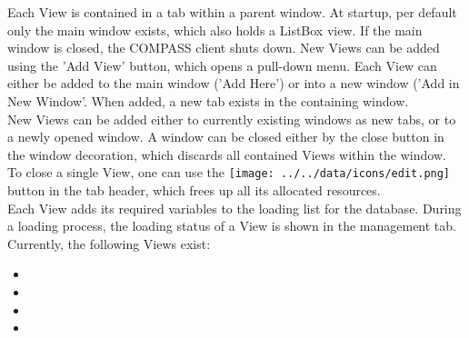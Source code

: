 Each View is contained in a tab within a parent window.  At startup, per default only the main window exists, which also holds
a ListBox view. If the main window is closed, the COMPASS client shuts down. New Views can be added using the 'Add View' button, which opens a pull-down menu. Each View can either be added to the main window ('Add Here') or into a new window ('Add in New Window'. When added, a new tab exists in the containing window. \\

New Views can be added either to currently existing windows as new tabs, or to a newly opened window. A window can be closed either by the close button in the window decoration, which discards all contained Views within the window.  \\

To close a single View, one can use the \texttt{[image: ../../data/icons/edit.png]} button in the tab header, which frees up all its allocated resources. \\

Each View adds its required variables to the loading list for the database. During a loading process, the loading status  of a View is shown in the management tab.\\

Currently, the following Views exist:
\begin{itemize}
 \item {}
 \item {}
 \item {}
 \item {}
\end{itemize}



 
